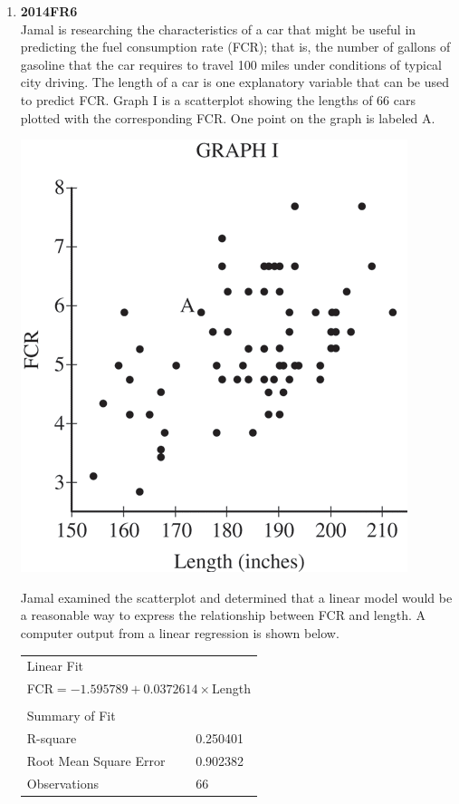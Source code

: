 \documentclass[a4paper,12pt,twoside]{book}
\begin{document}
\begin{enumerate}
  
\item \textbf{2014FR6}\\
Jamal is researching the characteristics of a car that might be useful in predicting the fuel consumption rate (FCR); that is, the number of gallons of gasoline that the car requires to travel 100 miles under conditions of typical city driving. The length of a car is one explanatory variable that can be used to predict FCR. Graph I is a scatterplot showing the lengths of 66 cars plotted with the corresponding FCR. One point on the graph is labeled A.
  
    \begin{center}
      \includegraphics[scale=0.5]{2014FR6-1.PNG}
    \end{center}
    
Jamal examined the scatterplot and determined that a linear model would be a reasonable way to express the relationship between FCR and length. A computer output from a linear regression is shown below.

   \begin{center}
       \begin{tabular}{ll}
       \multicolumn{2}{l}{Linear Fit}\\
       \multicolumn{2}{l}{FCR$=-1.595789+0.0372614\times$Length}\\
       &\\
       \multicolumn{2}{l}{Summary of Fit}\\
       R-square & 0.250401\\
       Root Mean Square Error &	0.902382\\
       Observations	& 66\\ 
       \end{tabular}
   \end{center}
  

\end{enumerate}
\end{document}

